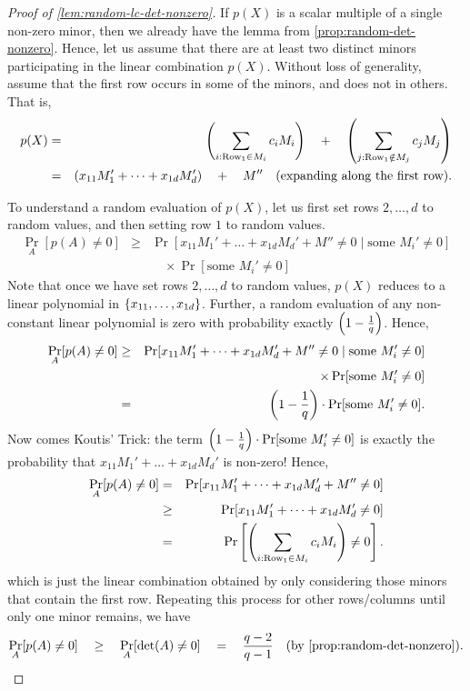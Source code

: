 \begin{proof}[Proof of \autoref{lem:random-lc-det-nonzero}]
  If $p(X)$ is a scalar multiple of a single non-zero minor, then we
  already have the lemma from
  \autoref{prop:random-det-nonzero}. 
Hence, let us assume that
  there are at least two distinct minors participating in the linear
  combination $p(X)$. 
Without loss of generality, assume that the
  first row occurs in some of the minors, and does not in others. 
That is, 
  \begin{eqnarray*}
    p(X) &=& \left(\sum_{i:\text{Row}_1\in M_i} c_i M_i\right) \quad+ \quad \left(\sum_{j:\text{Row}_1\notin M_j} c_j M_j\right)\\
     & = & \left(x_{11} M_1' + \dots + x_{1d} M_{d}'\right) \quad+\quad M'' \quad\text{(expanding along the first row)}.
  \end{eqnarray*}
  
  To understand a random evaluation of $p(X)$, let us first set rows
  $2, \dots, d$ to random values, and then setting row $1$ to random
  values.
  \begin{eqnarray*}
    \Pr_{A}[p(A)\neq 0] & \geq & \Pr[x_{11} M_1' + \dots + x_{1d} M_d' + M'' \neq 0 \;|\; \text{some }M_{i}'\neq 0]\\
    & & \quad \times \Pr[\text{some }M_i' \neq 0]
  \end{eqnarray*}
  Note that once we have set rows $2,\dots, d$ to random values,
  $p(X)$ reduces to a linear polynomial in $\left\{x_{11},\dots,
    x_{1d}\right\}$. 
Further, a random evaluation of any non-constant linear
  polynomial is zero with probability exactly $\left(1
    -\frac{1}{q}\right)$. 
Hence,
  \begin{eqnarray*}
\Pr_{A}[p(A)\neq 0] & \geq & \Pr[x_{11} M_1' + \dots + x_{1d} M_d' + M'' \neq 0 \;|\; \text{some }M_{i}'\neq 0]\\
 & & \quad \times \Pr[\text{some }M_i' \neq 0]\\
    & = & \left(1 - \frac{1}{q}\right)\cdot \Pr[\text{some }M_i' \neq 0].
  \end{eqnarray*}
  Now comes  Koutis' Trick: the term $\left(1 -
    \frac{1}{q}\right) \cdot \Pr[\text{some }M_i' \neq 0]$ is exactly the
  probability that $x_{11}M_1' + \dots + x_{1d}M_d'$ is non-zero! 
Hence,
\begin{eqnarray*}
\Pr_{A}[p(A) \neq 0] & = & \Pr[ x_{11}M_1' + \dots + x_{1d} M_d' + M''\neq 0]\\
 & \geq & \Pr[ x_{11}M_1' + \dots + x_{1d} M_d'\neq 0]\\
 & = & \Pr\left[\left(\sum_{i:\text{Row}_1\in M_i} c_i M_i\right) \neq 0\right].
\end{eqnarray*}
which is just the linear combination obtained by only considering
those minors that contain the first row. 
Repeating this process for other
rows/columns until only  one minor remains, we have
$$
\Pr_{A}[p(A) \neq 0] \quad \geq \quad \Pr_{A}[\det(A) \neq 0] \quad = \quad
\frac{q-2}{q-1}\quad(\text{by \autoref{prop:random-det-nonzero}}).\qedhere
$$
\end{proof}


